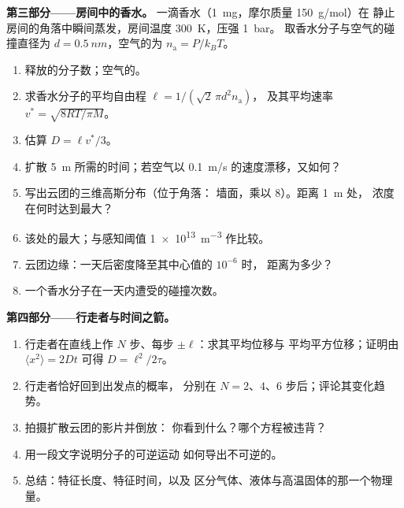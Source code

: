 \begin{problem}
\textbf{第三部分——房间中的香水。}
一滴香水（\qty{1}{mg}，摩尔质量 \qty{150}{g/mol}）在
静止房间的角落中瞬间蒸发，房间温度 \qty{300}{K}，压强 \qty{1}{bar}。
取香水分子与空气的碰撞直径为 $d =
\qty{0.5}{nm}$，空气的为 $n_{\text{a}} = P/k_BT$。
\begin{enumerate}[resume]
  \item 释放的分子数；空气的。
  \item 求香水分子的平均自由程 $\ell = 1/(\sqrt2\,\pi d^2 n_{\text{a}})$，
        及其平均速率 $v^* = \sqrt{8RT/\pi M}$。
  \item 估算 $D = \ell v^*/3$。
  \item 扩散 \qty{5}{m} 所需的时间；若空气以
        \qty{0.1}{m/s} 的速度漂移，又如何？
  \item 写出云团的三维高斯分布（位于角落：
        墙面，乘以 $8$）。距离 \qty{1}{m} 处，
        浓度在何时达到最大？
  \item 该处的最大；与感知阈值
        \qty{1e13}{m^{-3}} 作比较。
  \item 云团边缘：一天后密度降至其中心值的 $10^{-6}$ 时，
        距离为多少？
  \item 一个香水分子在一天内遭受的碰撞次数。
\end{enumerate}

\textbf{第四部分——行走者与时间之箭。}
\begin{enumerate}[resume]
  \item 行走者在直线上作 $N$ 步、每步 $\pm\ell$：求其平均位移与
        平均平方位移；证明由 $\langle x^2\rangle = 2Dt$
        可得 $D = \ell^2/2\tau$。
  \item 行走者恰好回到出发点的概率，
        分别在 $N = 2$、$4$、$6$ 步后；评论其变化趋势。
  \item 拍摄扩散云团的影片并倒放：
        你看到什么？哪个方程被违背？
  \item 用一段文字说明分子的可逆运动
        如何导出不可逆的。
  \item 总结：特征长度、特征时间，以及
        区分气体、液体与高温固体的那一个物理量。
\end{enumerate}
\end{problem}
